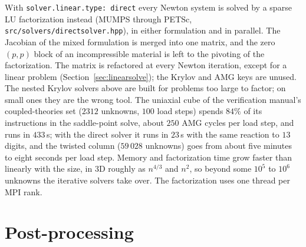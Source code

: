 \documentclass[11pt]{article}
\DeclareRobustCommand{\code}[1]{{\def\_{\textunderscore\allowbreak}\texttt{#1}}}
\DeclareRobustCommand{\file}[1]{{\def\_{\textunderscore\allowbreak}\texttt{#1}}}
\begin{document}
With \code{solver.linear.type: direct} every Newton system is solved by a
sparse LU factorization instead (MUMPS through PETSc,
\file{src/solvers/direct\_solver.hpp}), in either formulation and in
parallel.  The Jacobian of the mixed formulation is merged into one matrix,
and the zero $(p,p)$ block of an incompressible material is left to the
pivoting of the factorization.  The matrix is refactored at every Newton
iteration, except for a linear problem
(Section~\ref{sec:linearsolve}); the Krylov and AMG keys are unused.  The
nested Krylov solvers above are built for problems too large to factor; on
small ones they are the wrong tool.  The uniaxial cube of the verification
manual's coupled-theories set ($2312$ unknowns, $100$ load steps) spends
$84\%$ of its instructions in the saddle-point solve, about $250$ AMG cycles
per load step, and runs in $433$\,s; with the direct solver it runs in
$23$\,s with the same reaction to $13$ digits, and the twisted column
($59\,028$ unknowns) goes from about five minutes to eight seconds per load
step.  Memory and factorization time grow faster than linearly with the
size, in 3D roughly as $n^{4/3}$ and $n^{2}$, so beyond some $10^5$ to
$10^6$ unknowns the iterative solvers take over.  The factorization uses one
thread per MPI rank.

\section{Post-processing}
\label{sec:post}
\end{document}
